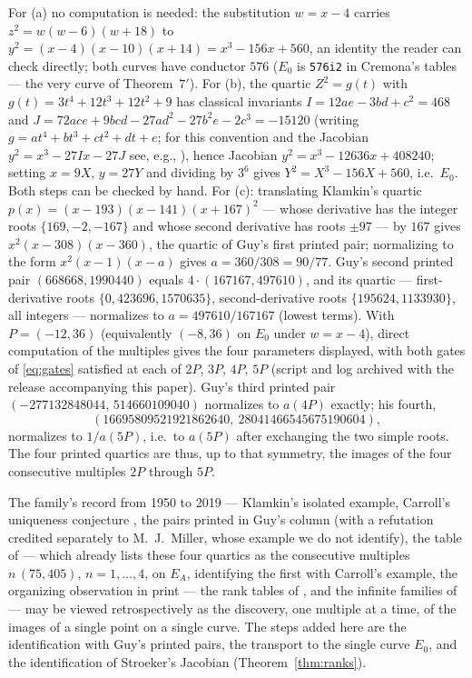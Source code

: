 \documentclass[11pt]{amsart}
\begin{document}
For (a) no computation is needed: the substitution $w=x-4$ carries
$z^2=w(w-6)(w+18)$ to $y^2=(x-4)(x-10)(x+14)=x^3-156x+560$, an identity
the reader can check directly; both curves have conductor $576$ ($E_0$
is \texttt{576i2} in Cremona's tables --- the very curve of
Theorem~$7'$).  For (b), the quartic $Z^2=g(t)$ with
$g(t)=3t^4+12t^3+12t^2+9$ has classical invariants
$I=12ae-3bd+c^2=468$ and $J=72ace+9bcd-27ad^2-27b^2e-2c^3=-15120$
(writing $g=at^4+bt^3+ct^2+dt+e$; for this convention and the Jacobian
$y^2=x^3-27Ix-27J$ see, e.g., \cite{Cremona1997}), hence Jacobian
$y^2=x^3-12636x+408240$; setting $x=9X$, $y=27Y$ and dividing by $3^6$
gives $Y^2=X^3-156X+560$, i.e.\ $E_0$.  Both steps can be checked by
hand.  For (c): translating Klamkin's quartic
$p(x)=(x-193)(x-141)(x+167)^2$ --- whose derivative has the integer
roots $\{169,-2,-167\}$ and whose second derivative has roots
$\pm 97$ --- by $167$ gives $x^2(x-308)(x-360)$, the quartic of Guy's
first printed pair; normalizing to the form $x^2(x-1)(x-a)$ gives
$a=360/308=90/77$.  Guy's second printed pair $(668668,1990440)$ equals
$4\cdot(167167,497610)$, and its quartic --- first-derivative roots
$\{0,423696,1570635\}$, second-derivative roots $\{195624,1133930\}$,
all integers --- normalizes to $a=497610/167167$ (lowest terms).  With
$P=(-12,36)$ (equivalently $(-8,36)$ on $E_0$ under $w=x-4$), direct
computation of the multiples gives the four parameters displayed, with
both gates of \eqref{eq:gates} satisfied at each of $2P$, $3P$, $4P$,
$5P$ (script and log archived with the release accompanying this
paper).  Guy's third printed pair
$(-277132848044,\,514660109040)$ normalizes to $a(4P)$ exactly; his
fourth,
\[
(16695809521921862640,\ 28041466545675190604),
\]
normalizes to $1/a(5P)$, i.e.\ to $a(5P)$ after exchanging the two
simple roots.  The four printed quartics are thus, up to that symmetry,
the images of the four consecutive multiples $2P$ through $5P$.

The family's record from 1950 to 2019 --- Klamkin's isolated example,
Carroll's uniqueness conjecture \cite{Carroll1989}, the pairs printed
in Guy's column \cite{Guy1989} (with a refutation credited separately
to M.~J.~Miller, whose example we do not identify), the table of
\cite{BK1995} --- which already lists these four quartics as the
consecutive multiples $n\,(75,405)$, $n=1,\dots,4$, on $E_{A}$,
identifying the first with Carroll's example, the organizing
observation in print --- the rank tables of \cite{BM2000}, and the
infinite families of \cite{BC2016,Carrillo2019} --- may be viewed
retrospectively as the discovery, one multiple at a time, of the images
of a single point on a single curve.  The steps added here are the
identification with Guy's printed pairs, the transport to the single
curve $E_{0}$, and the identification of Stroeker's Jacobian
(Theorem~\ref{thm:ranks}).
\end{document}
